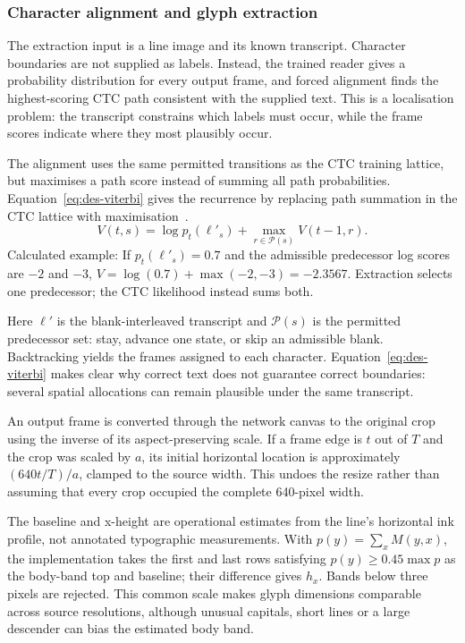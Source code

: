 \subsubsection{Character alignment and glyph extraction}
\label{sec:des-alignment}
The extraction input is a line image and its known transcript. Character boundaries are not supplied as labels. Instead, the trained reader gives a probability distribution for every output frame, and forced alignment finds the highest-scoring CTC path consistent with the supplied text. This is a localisation problem: the transcript constrains which labels must occur, while the frame scores indicate where they most plausibly occur.~\cite[style.py; synthesise.py; reproduce.py]{braunepipeline2026}


The alignment uses the same permitted transitions as the CTC training lattice, but maximises a path score instead of summing all path probabilities. Equation~\ref{eq:des-viterbi} gives the recurrence by replacing path summation in the CTC lattice with maximisation~\cite[PDF pp.~4--5]{graves2006}.
\begin{equation}
V(t,s)=\log p_t(\ell'_s)+\max_{r\in\mathcal P(s)}V(t-1,r).
\label{eq:des-viterbi}
\end{equation}
Calculated example: If $p_t(\ell'_s)=0.7$ and the admissible predecessor log scores are $-2$ and $-3$, $V=\log(0.7)+\max(-2,-3)=-2.3567$. Extraction selects one predecessor; the CTC likelihood instead sums both. \cite[recognise.py, CtcForcedAlign]{braunepipeline2026}

Here $\ell'$ is the blank-interleaved transcript and $\mathcal P(s)$ is the permitted predecessor set: stay, advance one state, or skip an admissible blank. Backtracking yields the frames assigned to each character. Equation~\ref{eq:des-viterbi} makes clear why correct text does not guarantee correct boundaries: several spatial allocations can remain plausible under the same transcript.~\cite[style.py; synthesise.py; reproduce.py]{braunepipeline2026}

An output frame is converted through the network canvas to the original crop using the inverse of its aspect-preserving scale. If a frame edge is $t$ out of $T$ and the crop was scaled by $a$, its initial horizontal location is approximately $(640t/T)/a$, clamped to the source width. This undoes the resize rather than assuming that every crop occupied the complete 640-pixel width.~\cite[style.py; synthesise.py; reproduce.py]{braunepipeline2026}

The baseline and x-height are operational estimates from the line's horizontal ink profile, not annotated typographic measurements. With $p(y)=\sum_x M(y,x)$, the implementation takes the first and last rows satisfying $p(y)\geq0.45\max p$ as the body-band top and baseline; their difference gives $h_x$. Bands below three pixels are rejected. This common scale makes glyph dimensions comparable across source resolutions, although unusual capitals, short lines or a large descender can bias the estimated body band.~\cite[style.py; synthesise.py; reproduce.py]{braunepipeline2026}

